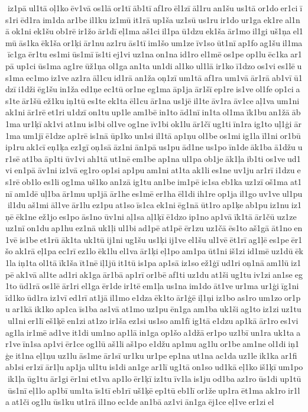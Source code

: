  iz1pā ul1tā oļ1ko ēv1vā os1lā or1tī āb1tī af1ro ēl1zī āl1ru an1šu us1tā or1do er1ci īs1ri ēd1ra im1da ar1be il1ku iz1mū it1rā up1ša uz1sū us1ru ir1do ur1ga ek1re al1nā ok1ni ek1šu ob1rē ir1žo ār1dī eļ1ma aš1ci il1pa ū1dzu ek1ša ār1mo il1gi uš1ņa el1mū ās1ka ēk1ša or1ķi ār1nu az1ru ās1tī im1šo um1ze īv1so ūt1nī ap1fo ag1šu il1ma īc1ga ēr1tu es1mi ūs1mī īs1ti ej1vi uz1na on1na id1ro el1mē os1pe op1lu ēc1ka ar1pā up1ci ūs1ma ag1re ūž1ņa ol1ga an1ta un1di al1ko ul1lā ir1ko ī1dzo os1vi es1lē us1ma ec1mo iz1ve az1ra āl1cu id1rā an1ža oņ1zī um1tā af1ra um1vā ār1rā ab1vī ū1dzī i1dži ēg1šu in1ža ed1ņe ec1tū or1ne eg1ma āp1ja ār1šī ep1re is1ve ol1fe op1ci as1te ār1šū ež1ku iņ1tū es1te ek1ta ēl1cu ār1na us1jē il1te āv1ra āv1ce aļ1va um1ni ak1ni ār1rē et1ri u1dzī on1tu up1le am1bē in1to ād1nī in1ta ol1ma īk1bu an1žā āb1ma ur1ķī ak1vi at1nu is1bi ol1ve og1ne īv1bi ok1lu ār1čī ug1ti īn1ra ig1to uļ1ģi ār1ma um1jī ē1dze ap1rē is1nā ūp1ko un1si il1tā ap1ņu ol1be os1mi ig1la īl1ni or1bū ip1ru ak1cī eņ1ķa ez1gī oņ1sā āz1ni ān1pā us1pu ād1ne us1po īn1de āk1ba ā1džu ur1sē at1ba āp1ti ūv1vi ah1tā ut1nē em1be ap1na ul1pa ob1je āk1ļa ib1ti os1ve ud1vi en1pā āv1ni iz1vā eg1ro op1si ap1pu am1ni at1ta ak1li es1ne uv1ju ar1rī i1dzu es1rē ob1lo es1li og1ma uš1ko an1zā ig1tu an1be im1pē ic1sa eb1ka uz1zī oš1ma at1nī am1dē uļ1ba ār1mu up1jā ār1he es1mē er1ha ēl1di ih1re op1ja il1go uv1ve ul1pu il1du aš1mi āl1ve ār1lu ez1pu at1so īs1ca ek1ni ēg1nā ūt1ro ap1ķe ab1pu iz1nu iz1ņē ēk1ne ež1jo es1po ās1no ūv1ni aļ1sa aļ1ķī ē1dzo ip1no ap1vā īk1tā ār1čū uz1ze uz1nī on1du ap1hu ez1nā uk1ļi ul1bi ad1pē at1pē ēr1zu uz1čā ēs1to aš1gā āt1no en1vē is1be et1rū āk1ta uk1tū ij1ni ug1šu us1ķi ij1ve el1šu ul1vē ēt1rī ag1ļē es1pe ēr1šo ak1rā eļ1pa ec1rī ez1lo ēk1lu el1va ār1ķi eļ1po am1pa ūt1ni iš1zi id1mē uz1dū ēk1la iņ1ta ol1tā īk1ša īt1nē iļ1jū it1tū is1pa ap1sā iz1so ež1ģī ud1ri oņ1nā am1lū iz1pē ak1vā al1te ad1ri ak1ga ār1bā ap1rī or1bē af1ti uz1du at1ši ug1tu iv1zi an1se eg1to ūd1rā os1lē ār1ri el1ga ēr1de ir1tē em1ļa us1na im1do āt1ve ur1ma ur1ģi īg1ni īd1ko ūd1ra iz1vī ed1rī at1jā il1mo e1dza ēk1to ār1ģē iļ1ņi iz1bo as1ro um1zo or1pu ar1kā ik1ko ap1ca īs1ba as1vā at1mo uz1pu ēn1ga am1ba uk1ši ag1to iz1zi uz1tu ul1ni er1lī eš1ķē en1zi at1zo ir1ša ez1si us1so am1fī ig1tā e1dzu ap1kā ār1ro es1vi ag1la ir1mē ad1ve it1di um1no ap1lā in1ga op1šo a1džā er1po uz1bī un1ra uk1ta ar1ve īn1sa ap1vi ēr1ce og1lū aš1li aš1po e1džu ap1mu ag1lu or1be am1ne ol1di iņ1ģe it1na eļ1ņu uz1lu ās1me ār1sī ur1ku ur1pe ep1na ut1na ac1da uz1le ik1ka ar1fi ab1si er1zī ār1ļu ap1ja ul1tu is1di an1ge ar1lī ug1tā on1so ud1kā eļ1ko iš1ķī um1po ik1ļa ūg1tu ār1gi ēr1ni et1va ap1lo ēr1ķī iz1tu īv1la is1ju od1ba az1ro ūs1di up1tū ūs1nī eļ1lo ap1bī um1ta īs1tī eb1rī uš1ķē ep1tū eb1lī or1že up1ra ēt1ma ak1ro ir1la at1či og1lu ūs1ku ut1rā il1no ec1de an1bā az1vi ān1ga ēj1ce eļ1ve er1zi el